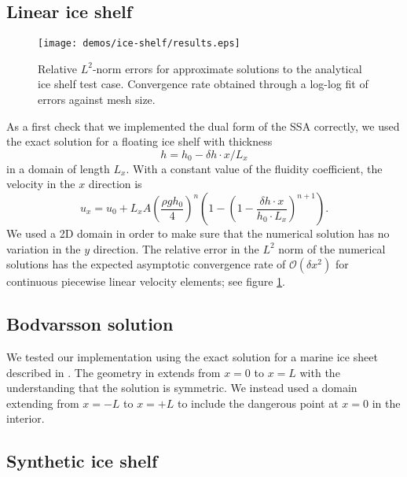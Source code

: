 \documentclass{article}
\theoremstyle{definition}
\theoremstyle{plain}
\begin{document}
\subsection{Linear ice shelf}

\begin{figure}[h]
    \begin{center}
        \texttt{[image: demos/ice-shelf/results.eps]}
    \end{center}
    \caption{Relative $L^2$-norm errors for approximate solutions to the analytical ice shelf test case.
    Convergence rate obtained through a log-log fit of errors against mesh size.}
    \label{fig:linear-ice-shelf-convergence-rate}
\end{figure}

As a first check that we implemented the dual form of the SSA correctly, we used the exact solution for a floating ice shelf with thickness
\begin{equation}
    h = h_0 - \delta h \cdot x / L_x
\end{equation}
in a domain of length $L_x$.
With a constant value of the fluidity coefficient, the velocity in the $x$ direction is
\begin{equation}
    u_x = u_0 + L_x A \left(\frac{\rho g h_0}{4}\right)^n\left(1 - \left(1 - \frac{\delta h \cdot x}{h_0\cdot L_x}\right)^{n + 1}\right).
\end{equation}
We used a 2D domain in order to make sure that the numerical solution has no variation in the $y$ direction.
The relative error in the $L^2$ norm of the numerical solutions has the expected asymptotic convergence rate of $\mathscr{O}(\delta x^2)$ for continuous piecewise linear velocity elements; see figure \ref{fig:linear-ice-shelf-convergence-rate}.

\subsection{Bodvarsson solution}

We tested our implementation using the exact solution for a marine ice sheet described in \citet{bueler2014exact}.
The geometry in \citet{bueler2014exact} extends from $x = 0$ to $x = L$ with the understanding that the solution is symmetric.
We instead used a domain extending from $x = -L$ to $x = +L$ to include the dangerous point at $x = 0$ in the interior.

\subsection{Synthetic ice shelf}
\end{document}
